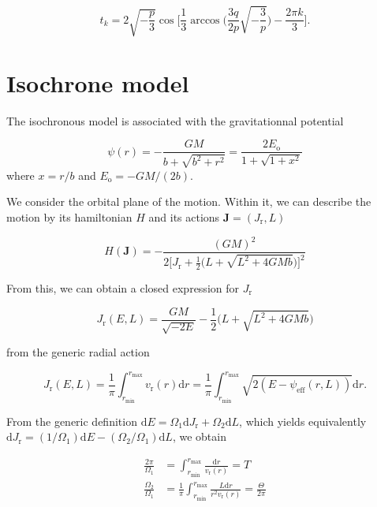 \documentclass[11pt]{article}
\newcommand{\rr}{\mathrm{r}}
\newcommand{\ro}{\mathrm{o}}
\newcommand{\rd}{{\mathrm{d}}}
\newcommand{\psieff}{\psi_{\mathrm{eff}}}
\newcommand{\vr}{v_{\rr}}
\newcommand{\Eo}{E_{\ro}}
\newcommand{\Jr}{J_{\rr}}
\newcommand{\rmax}{r_{\max}}
\newcommand{\rmin}{r_{\min}}
\newcommand{\bJ}{\boldsymbol{J}}
\begin{document}
\begin{equation}
  t_{k} = 2\sqrt{-\frac{p}{3}} \cos\bigg[\frac{1}{3}\arccos\bigg(\frac{3q}{2p} \sqrt{-\frac{3}{p}}\bigg)-\frac{2\pi k}{3}\bigg] .
  \label{eq:Viete_formula_bounds_Plummer}
\end{equation}


\section{Isochrone model}
\label{sec:Isochrone}

The isochronous model is associated with the gravitationnal potential

\begin{equation}
  \psi(r) = - \frac{GM}{b+\sqrt{b^{2}+r^{2}}} = \frac{2 \Eo}{1+\sqrt{1+x^{2}}}
  \label{eq:IsoPotential}
\end{equation}
where $x=r/b$ and $\Eo=-GM/(2b)$.

We consider the orbital plane of the motion. Within it, we can describe the motion by its hamiltonian $H$ and its actions $\bJ = (\Jr,L)$

\begin{equation}
  H(\bJ) = - \frac{(GM)^{2}}{2 \bigg[\Jr + \frac{1}{2} \bigg(L+\sqrt{L^{2}+4GMb}\bigg)\bigg]^{2}}
  \label{eq:HamiltionianIso}
\end{equation}

From this, we can obtain a closed expression for $\Jr$

\begin{equation}
  \Jr (E,L)= \frac{GM}{\sqrt{-2E}} - \frac{1}{2} \bigg(L+\sqrt{L^{2}+4GMb}\bigg)
  \label{eq:Jr_Iso}
\end{equation}

from the generic radial action

\begin{equation}
  \Jr (E,L)= \frac{1}{\pi} \int_{\rmin}^{\rmax} \vr(r) \rd r =  \frac{1}{\pi} \int_{\rmin}^{\rmax} \sqrt{2(E-\psieff(r,L))} \rd r .
  \label{eq:Jr_Generic}
\end{equation}

From the generic definition $\rd E = \Omega_{1} \rd \Jr + \Omega_{2} \rd L$, which yields equivalently $\rd \Jr = (1/\Omega_{1}) \rd E - (\Omega_{2}/\Omega_{1}) \rd L$, we obtain

\begin{align*}
  \frac{2\pi}{\Omega_{1}} &= \int_{\rmin}^{\rmax} \frac{\rd r}{\vr(r)} = T \\
  \frac{\Omega_{2}}{\Omega_{1}} &= \frac{1}{\pi} \int_{\rmin}^{\rmax} \frac{L \rd r}{r^{2} \vr(r)} = \frac{\Theta}{2\pi}
\end{align*}
\end{document}
